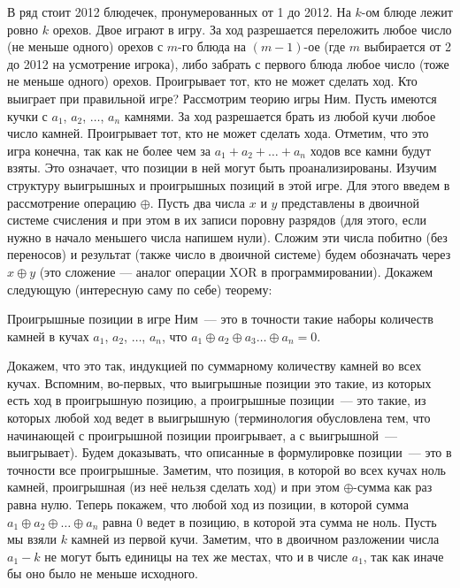 \problem{}
В ряд стоит 2012 блюдечек, пронумерованных от 1 до 2012.
На $k$-ом блюде лежит ровно $k$ орехов.
Двое играют в игру.
За ход разрешается переложить любое число (не меньше одного) орехов с $m$-го
блюда на $(m - 1)$-ое (где $m$ выбирается от 2 до 2012 на усмотрение игрока),
либо забрать с первого блюда любое число (тоже не меньше одного) орехов.
Проигрывает тот, кто не может сделать ход.
Кто выиграет при правильной игре?
\solution
Рассмотрим теорию игры Ним.
Пусть имеются кучки с $a_1$, $a_2$, $\ldots$, $a_n$ камнями.
За ход разрешается брать из любой кучи любое число камней.
Проигрывает тот, кто не может сделать хода.
Отметим, что это игра конечна, так как не более чем за
$a_1 + a_2 + \ldots + a_n$ ходов все камни будут взяты.
Это означает, что позиции в ней могут быть проанализированы.
Изучим структуру выигрышных и проигрышных позиций в этой игре.
Для этого введем в рассмотрение операцию $\oplus$.
Пусть два числа $x$ и $y$ представлены в двоичной системе счисления и при этом
в их записи поровну разрядов
(для этого, если нужно в начало меньшего числа напишем нули).
Сложим эти числа побитно (без переносов) и результат
(также число в двоичной системе) будем обозначать через $x \oplus y$
(это сложение --- аналог операции XOR в программировании).
Докажем следующую (интересную саму по себе) теорему:
\par
\theorem
Проигрышные позиции в игре Ним~--- это в точности такие наборы количеств
камней в кучах $a_1$, $a_2$, $\ldots$, $a_n$, что
$a_1 \oplus a_2 \oplus a_3 \ldots \oplus a_n = 0$.
\par
Докажем, что это так, индукцией по суммарному количеству камней во всех кучах.
Вспомним, во-первых, что выигрышные позиции это такие, из которых есть ход
в проигрышную позицию, а проигрышные позиции~--- это такие, из которых любой
ход ведет в выигрышную
(терминология обусловлена тем, что начинающей с проигрышной позиции
проигрывает, а с выигрышной~--- выигрывает).
Будем доказывать, что описанные в формулировке позиции~--- это в точности все
проигрышные.
Заметим, что позиция, в которой во всех кучах ноль камней, проигрышная
(из неё нельзя сделать ход) и при этом $\oplus$-сумма как раз равна нулю.
Теперь покажем, что любой ход из позиции, в которой сумма
$a_1 \oplus a_2 \oplus \ldots \oplus a_n$ равна 0 ведет в позицию, в которой
эта сумма не ноль.
Пусть мы взяли $k$ камней из первой кучи.
Заметим, что в двоичном разложении числа $a_1 - k$ не могут быть единицы на тех
же местах, что и в числе $a_1$, так как иначе бы оно было не меньше исходного.
